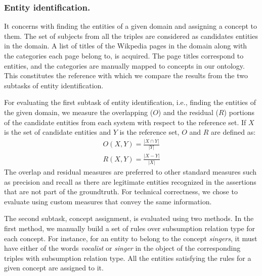 \documentclass{llncs}
\begin{document}
\subsubsection{Entity identification.} It concerns with finding the entities of a given domain and assigning a concept to them. The set of subjects from all the triples are considered as candidates entities in the domain. A list of titles of the Wikpedia pages in the domain along with the categories each page belong to, is acquired. The page titles correspond to entities, and the categories are manually mapped to concepts in our ontology. This constitutes the reference with which we compare the results from the two subtasks of entity identification.

For evaluating the first subtask of entity identification, i.e., finding the entities of the given domain, we measure the overlapping ($O$) and the residual ($R$) portions of the candidate entities from each system with respect to the reference set. If $X$ is the set of candidate entities and $Y$ is the reference set, $O$ and $R$ are defined as:
\begin{eqnarray}
\label{eq:overlap}
O(X, Y) = \frac{\left|X \cap Y \right|}{\left|Y\right|} \\\nonumber
R(X, Y) = \frac{\left|X - Y \right|}{\left|X\right|}
\end{eqnarray}
The overlap and residual measures are preferred to other standard measures such as precision and recall as there are legitimate entities recognized in the assertions that are not part of the groundtruth. For technical correctness, we chose to evaluate using custom measures that convey the same information.

The second subtask, concept assignment, is evaluated using two methods. In the first method, we manually build a set of rules over subsumption relation type for each concept. For instance, for an entity to belong to the concept \textit{singers}, it must have either of the words \textit{vocalist} or \textit{singer} in the object of the corresponding triples with subsumption relation type. All the entities satisfying the rules for a given concept are assigned to it.
\end{document}

